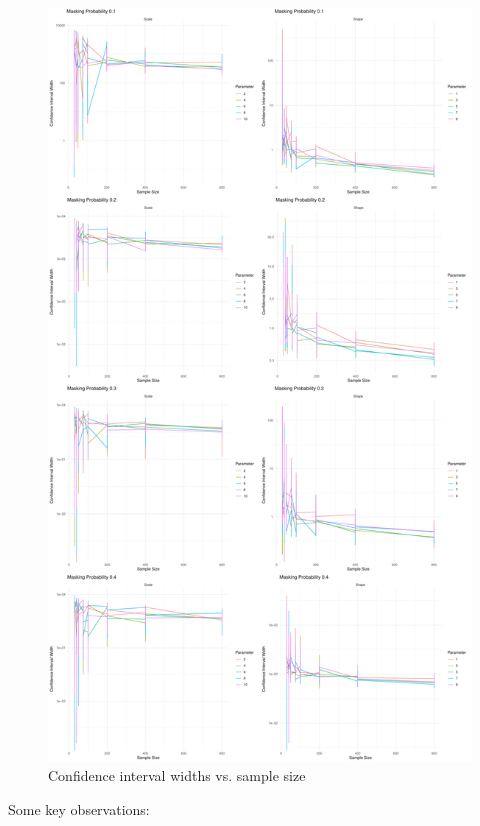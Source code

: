 \documentclass[
]{article}
\begin{document}
\begin{figure}

{\centering \includegraphics{image/ci-widths} 

}

\caption{Confidence interval widths vs. sample size}\label{fig:plot-ci-width-vs-sample-size}
\end{figure}

Some key observations:
\end{document}
